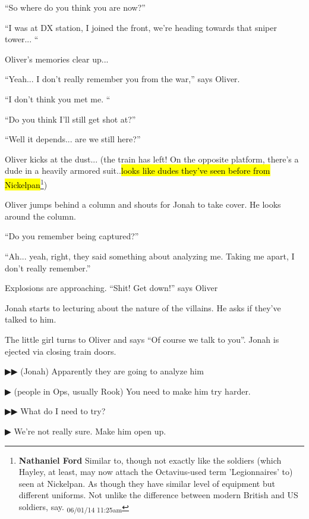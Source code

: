 ``So where do you think you are now?''

``I was at DX station, I joined the front, we're heading towards that sniper tower... ``

Oliver's memories clear up...

``Yeah... I don't really remember you from the war,'' says Oliver.

``I don't think you met me. ``

``Do you think I'll still get shot at?''

``Well it depends... are we still here?''

Oliver kicks at the dust...  (the train has left!  On the opposite platform, there's a dude in a heavily armored suit..\hl{looks like dudes they've seen before from Nickelpan}\footnote{\textbf{Nathaniel Ford }Similar to, though not exactly like the soldiers (which Hayley, at least, may now attach the Octavius-used term 'Legionnaires' to) seen at Nickelpan. As though they have similar level of equipment but different uniforms. Not unlike the difference between modern British and US soldiers, say. \textsubscript{06/01/14 11:25am}}) 

Oliver jumps behind a column and shouts for Jonah to take cover.  He looks around the column.

``Do you remember being captured?''

``Ah... yeah, right, they said something about analyzing me.  Taking me apart, I don't really remember.''

Explosions are approaching. ``Shit! Get down!'' says Oliver

Jonah starts to lecturing about the nature of the villains.  He asks if they've talked to him.

The little girl turns to Oliver and says ``Of course we talk to you''.  Jonah is ejected via closing train doors. 



 {\color[RGB]{68,68,68}▶▶ }  (Jonah) Apparently they are going to analyze him

 {\color[RGB]{68,68,68}▶ } (people in Ops, usually Rook) You need to make him try harder.  

 {\color[RGB]{68,68,68}▶▶ } What do I need to try?

 {\color[RGB]{68,68,68}▶ } We're not really sure. Make him open up. 







